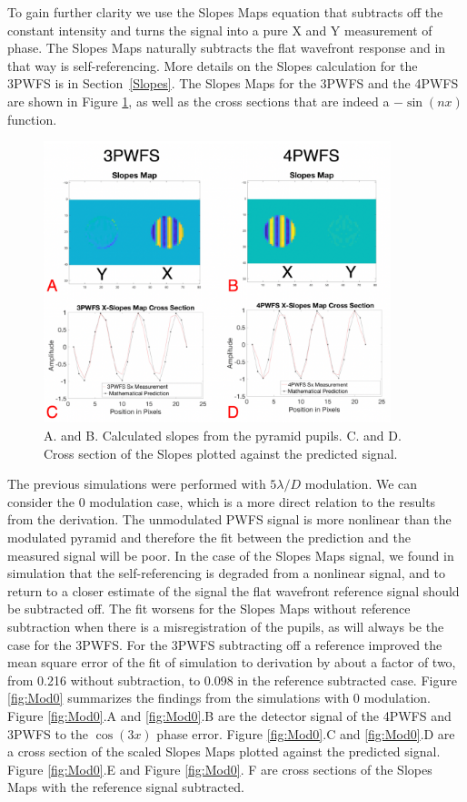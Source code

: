 To gain further clarity we use the Slopes Maps equation that subtracts off the constant intensity and turns the signal into a pure X and Y measurement of phase. The Slopes Maps naturally subtracts the flat wavefront response and in that way is self-referencing.  More details on the Slopes calculation  for the 3PWFS is in Section~\ref{Slopes}. The Slopes Maps for the 3PWFS and the 4PWFS are shown in Figure \ref{fig:SlopesMapDiagram}, as well as the cross sections that are indeed a $-\sin(nx)$ function. 

\begin{figure}
    \centering
    \includegraphics[width=0.9\textwidth]{Chapter Materials/Chapter Two Materials/SlopesMapsAndSlices.png}
    \caption{A. and B. Calculated slopes from the pyramid pupils. C. and D. Cross section of the Slopes plotted against the predicted signal. }
    \label{fig:SlopesMapDiagram}
\end{figure}

The previous simulations were performed with $5\lambda/D$ modulation. We can consider the 0 modulation case, which is a more direct relation to the results from the derivation. The unmodulated PWFS signal is more nonlinear than the modulated pyramid and therefore the fit between the prediction and the measured signal will be poor. In the case of the Slopes Maps signal, we found in simulation that the self-referencing is degraded from a nonlinear signal, and to return to a closer estimate of the signal the flat wavefront reference signal should be subtracted off. The fit worsens for the Slopes Maps without reference subtraction when there is a misregistration of the pupils, as will always be the case for the 3PWFS. For the 3PWFS subtracting off a reference improved the mean square error of the fit of simulation to derivation by about a factor of two, from 0.216 without subtraction, to 0.098 in the reference subtracted case. Figure \ref{fig:Mod0} summarizes the findings from the simulations with 0 modulation. Figure \ref{fig:Mod0}.A and \ref{fig:Mod0}.B are the detector signal of the 4PWFS and 3PWFS to the $\cos(3x)$ phase error. Figure \ref{fig:Mod0}.C and \ref{fig:Mod0}.D are a cross section of the scaled Slopes Maps plotted against the predicted signal. Figure \ref{fig:Mod0}.E and Figure \ref{fig:Mod0}. F are cross sections of the Slopes Maps with the reference signal subtracted.

